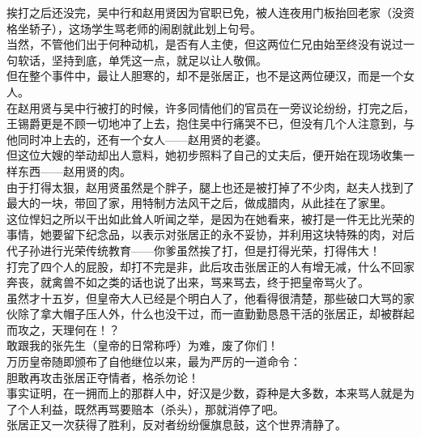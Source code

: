 \begin{multicols}{\theparacolNo}
挨打之后还没完，吴中行和赵用贤因为官职已免，被人连夜用门板抬回老家（没资格坐轿子），这场学生骂老师的闹剧就此划上句号。\\

当然，不管他们出于何种动机，是否有人主使，但这两位仁兄由始至终没有说过一句软话，坚持到底，单凭这一点，就足以让人敬佩。\\

但在整个事件中，最让人胆寒的，却不是张居正，也不是这两位硬汉，而是一个女人。\\

在赵用贤与吴中行被打的时候，许多同情他们的官员在一旁议论纷纷，打完之后，王锡爵更是不顾一切地冲了上去，抱住吴中行痛哭不已，但没有几个人注意到，与他同时冲上去的，还有一个女人——赵用贤的老婆。\\

但这位大嫂的举动却出人意料，她初步照料了自己的丈夫后，便开始在现场收集一样东西——赵用贤的肉。\\

由于打得太狠，赵用贤虽然是个胖子，腿上也还是被打掉了不少肉，赵夫人找到了最大的一块，带回了家，用特制方法风干之后，做成腊肉，从此挂在了家里。\\

这位悍妇之所以干出如此耸人听闻之举，是因为在她看来，被打是一件无比光荣的事情，她要留下纪念品，以表示对张居正的永不妥协，并利用这块特殊的肉，对后代子孙进行光荣传统教育——你爹虽然挨了打，但是打得光荣，打得伟大！\\

打完了四个人的屁股，却打不完是非，此后攻击张居正的人有增无减，什么不回家奔丧，就禽兽不如之类的话也说了出来，骂来骂去，终于把皇帝骂火了。\\

虽然才十五岁，但皇帝大人已经是个明白人了，他看得很清楚，那些破口大骂的家伙除了拿大帽子压人外，什么也没干过，而一直勤勤恳恳干活的张居正，却被群起而攻之，天理何在！？\\

敢跟我的张先生（皇帝的日常称呼）为难，废了你们！\\

万历皇帝随即颁布了自他继位以来，最为严厉的一道命令：\\

胆敢再攻击张居正夺情者，格杀勿论！\\

事实证明，在一拥而上的那群人中，好汉是少数，孬种是大多数，本来骂人就是为了个人利益，既然再骂要赔本（杀头），那就消停了吧。\\

张居正又一次获得了胜利，反对者纷纷偃旗息鼓，这个世界清静了。\\


\end{multicols}
